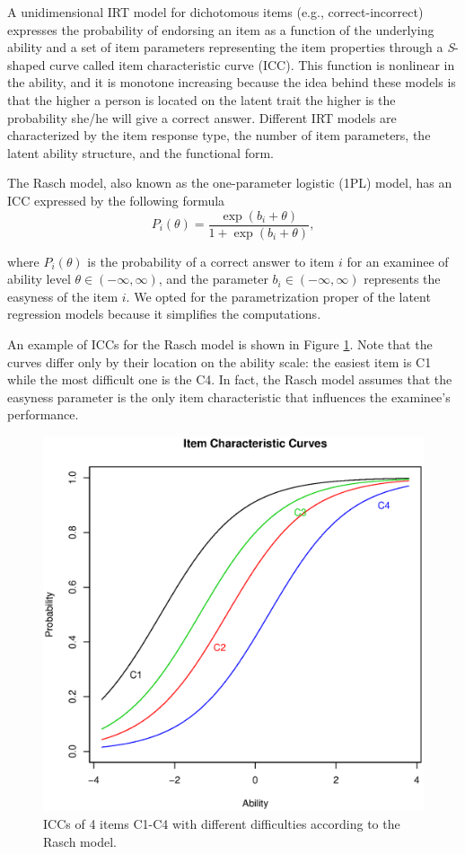 A unidimensional IRT model for dichotomous items (e.g., correct-incorrect) expresses the probability of endorsing an item as a function of the underlying ability and a set of item parameters representing the item properties through a \textit{S}-shaped curve called item characteristic curve (ICC). This function is nonlinear in the ability, and it is monotone increasing because the idea behind these models is that the higher a person is located on the latent trait the higher is the probability she/he will give a correct answer. Different IRT models are characterized by the item response type, the number of item parameters, the latent ability structure, and the functional form.

The Rasch model, also known as the one-parameter logistic (1PL) model, has an ICC expressed by the following formula
\begin{equation}
P_i(\theta)=\frac{\exp(b_i+\theta)}{1+ \exp(b_i+\theta)},
\end{equation}

\noindent where $P_i(\theta)$ is the probability of a correct answer to item $i$ for an examinee of ability level $\theta \in (-\infty,\infty)$, and the parameter $b_i \in (-\infty,\infty) $ represents the easyness of the item $i$. We opted for the parametrization proper of the latent regression models because it simplifies the computations.

An example of ICCs for the Rasch model is shown in Figure \ref{fig:icc}. Note that the curves differ only by their location on the ability scale: the easiest item is C1 while the most difficult one is the C4. In fact, the Rasch model assumes that the easyness parameter is the only item characteristic that influences the examinee's performance.

\begin{figure}[h]
	\centering
	\includegraphics[scale=0.5]{icc.eps}
	\caption{ICCs of 4 items C1-C4 with different difficulties according to the Rasch model.}
	\label{fig:icc}
\end{figure}

